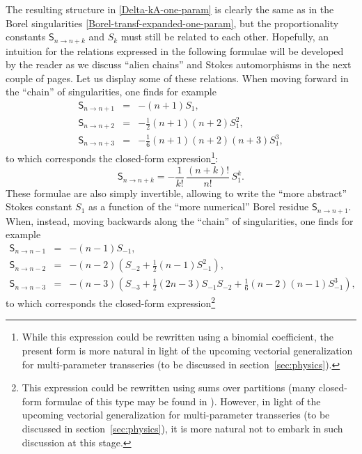 \documentclass[11pt,a4paper]{article}
\newcommand{\be}{\begin{equation}}
\newcommand{\ee}{\end{equation}}
\newcommand{\bea}{\begin{eqnarray}}
\newcommand{\eea}{\end{eqnarray}}
\begin{document}
The resulting structure in \eqref{Delta-kA-one-param} is clearly the same as in the Borel singularities \eqref{Borel-transf-expanded-one-param}, but the proportionality constants $\mathsf{S}_{n\to n+k}$ and $S_k$ must still be related to each other. Hopefully, an intuition for the relations expressed in the following formulae will be developed by the reader as we discuss ``alien chains'' and Stokes automorphisms in the next couple of pages. Let us display some of these relations. When moving forward in the ``chain'' of singularities, one finds for example
%
\bea
\label{stokesS-to-borelS+1}
\mathsf{S}_{n\to n+1} &=& - \left(n+1\right) S_1, \\
\label{stokesS-to-borelS+2}
\mathsf{S}_{n\to n+2} &=& - \frac{1}{2} \left(n+1\right) \left(n+2\right) S_1^2, \\
\label{stokesS-to-borelS+3}
\mathsf{S}_{n\to n+3} &=& - \frac{1}{6} \left(n+1\right) \left(n+2\right) \left(n+3\right) S_1^3,
\eea
%
\noindent
to which corresponds the closed-form expression\footnote{While this expression could be rewritten using a binomial coefficient, the present form is more natural in light of the upcoming vectorial generalization for multi-parameter transseries (to be discussed in section~\ref{sec:physics}).}:
%
\be
\label{stokesS-to-borelS+GEN}
\mathsf{S}_{n\to n+k} = - \frac{1}{k!}\, \frac{\left(n+k\right)!}{n!}\, S_1^k.
\ee
%
\noindent
These formulae are also simply invertible, allowing to write the ``more abstract'' Stokes constant $S_1$ as a function of the ``more numerical'' Borel residue $\mathsf{S}_{n\to n+1}$. When, instead, moving backwards along the ``chain'' of singularities, one finds for example
%
\bea
\label{stokesS-to-borelS-1}
\mathsf{S}_{n\to n-1} &=& -\left(n-1\right) S_{-1}, \\
\label{stokesS-to-borelS-2}
\mathsf{S}_{n\to n-2} &=& -\left(n-2\right) \left( S_{-2} + \frac{1}{2} \left(n-1\right) S_{-1}^2 \right), \\
\label{stokesS-to-borelS-3}
\mathsf{S}_{n\to n-3} &=& -\left(n-3\right) \left( S_{-3} + \frac{1}{2} \left(2n-3\right) S_{-1} S_{-2} + \frac{1}{6} \left(n-2\right) \left(n-1\right) S_{-1}^3 \right),
\eea
%
\noindent
to which corresponds the closed-form expression\footnote{This expression could be rewritten using sums over partitions (many closed-form formulae of this type may be found in \cite{asv11, as13}). However, in light of the upcoming vectorial generalization for multi-parameter transseries (to be discussed in section~\ref{sec:physics}), it is more natural not to embark in such discussion at this stage.}
\end{document}
